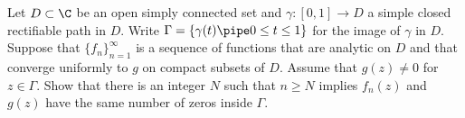 Let $D\subset \C$ be an open simply connected set and
$\gamma:[0,1]\rightarrow D$ a simple closed rectifiable path in $D$.
Write $\Gamma=\{\gamma(t) \pipe 0\leq t\leq 1\}$ for the image of $\gamma$
in $D$. Suppose that $\{f_n\}_{n=1}^{\infty}$ is a sequence of
functions that are analytic on $D$ and that converge uniformly to $g$
on compact subsets of $D$. Assume that $g(z)\neq 0$ for $z\in
\Gamma$. Show that there is an integer $N$ such that $n\geq N$ implies
$f_n(z)$ and $g(z)$ have the same number of zeros inside $\Gamma$.
